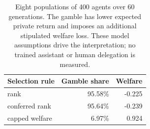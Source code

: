 \begin{table}[t]\centering\small\begin{tabular}{lrr}\toprule
Selection rule & Gamble share & Welfare\\\midrule
rank & 95.58\% & -0.225\\
conferred rank & 95.64\% & -0.239\\
capped welfare & 6.97\% & 0.924\\
\bottomrule\end{tabular}\caption{Eight populations of 400 agents over 60 generations. The gamble has lower expected private return and imposes an additional stipulated welfare loss. These model assumptions drive the interpretation; no trained assistant or human delegation is measured.}\label{tab:selection}\end{table}
